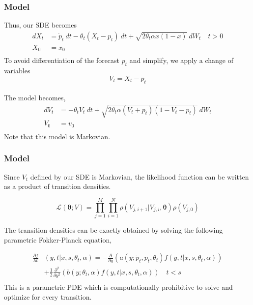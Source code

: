 \documentclass[aspectratio=169]{beamer}\usepackage[utf8]{inputenc}
\begin{document}
\begin{frame}\frametitle{Model}
Thus, our SDE becomes
\begin{equation}
\begin{split}
dX_t&= \dot{p}_t \ dt - \theta_t(X_t - p_t) \ dt + \sqrt{2 \theta_t \alpha x (1-x)}  \ dW_t \quad t > 0 \\
X_0&=x_0\\
\end{split}
\label{model:derivative_tracking_X}
\end{equation}
To avoid differentiation of the forecast $p_t$ and simplify, we apply a change of variables $$V_t = X_t - p_t$$ \\
The  model becomes,
\begin{equation}
\begin{split}
dV_t &=  - \theta_t V_t \  dt + \sqrt{2 \theta_t \alpha (V_t +p_t ) (1-V_t-p_t)} \  dW_t  \\ %
V_0 & = v_0\\
\end{split}\label{VtSDE}
\end{equation}
Note that this model is Markovian.
\end{frame}

\begin{frame}\frametitle{Model}
Since $V_t$ defined by our SDE is Markovian, the likelihood function can be written as a product of transition densities.

\begin{equation}
\mathcal{L}(\bm{\theta};V) =\prod\limits_{j=1}^M \prod\limits_{i=1}^N \rho ( {V_{j,i+1}|V_{j,i}}, \bm{\theta})  \rho (V_{j,0})
\label{likelihood}
\end{equation}

The transition densities can be exactly obtained by solving the following parametric Fokker-Planck equation,

\begin{equation}
\begin{split}
\frac{ \partial f }{\partial t } & (y ,t | x , s, \theta_t, \alpha )= - \frac{\partial}{ \partial y} ( a( y;\dot{p}_t , p_t, \theta_t ) f( y ,t | x , s, \theta_t , \alpha ) ) \\
& + \frac{1}{2} \frac{\partial^2}{ \partial y^2} ( b(y;\theta_t, \alpha  )  f( y ,t | x , s, \theta_t , \alpha )  ) \quad  t < s\\
\end{split}
\end{equation}
This is a parametric PDE which is computationally prohibitive to solve and optimize for every transition.
\end{frame}
\end{document}
